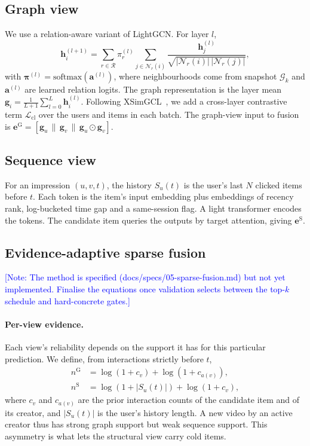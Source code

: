 \documentclass[sigconf,anonymous,review]{acmart}
\newif\ifshownotes \shownotestrue
\newcommand{\note}[1]{\ifshownotes\textcolor{blue}{[Note: #1]}\fi}
\newcommand{\bm}[1]{\boldsymbol{#1}}
\begin{document}
\subsection{Graph view}
We use a relation-aware variant of LightGCN. For layer $l$,
\begin{equation}
  \bm{h}^{(l+1)}_i = \sum_{r \in \mathcal{R}} \pi^{(l)}_r
    \sum_{j \in \mathcal{N}_r(i)} \frac{\bm{h}^{(l)}_j}{\sqrt{|\mathcal{N}_r(i)|\,|\mathcal{N}_r(j)|}},
\end{equation}
with $\bm{\pi}^{(l)} = \mathrm{softmax}(\bm{a}^{(l)})$,
where neighbourhoods come from snapshot $\mathcal{G}_k$ and $\bm{a}^{(l)}$
are learned relation logits. The graph representation is the layer mean
$\bm{g}_i = \frac{1}{L+1}\sum_{l=0}^{L} \bm{h}^{(l)}_i$. Following
XSimGCL~\cite{yu2023xsimgcl}, we add a cross-layer contrastive term
$\mathcal{L}_{\mathrm{cl}}$ over the users and items in each batch. The
graph-view input to fusion is
$\bm{e}^{\mathrm{G}} = [\bm{g}_u \,\|\, \bm{g}_v \,\|\, \bm{g}_u \odot \bm{g}_v]$.

\subsection{Sequence view}
For an impression $(u, v, t)$, the history $S_u(t)$ is the user's last $N$
clicked items before $t$. Each token is the item's input embedding plus
embeddings of recency rank, log-bucketed time gap and a same-session flag. A
light transformer encodes the tokens. The candidate item queries the outputs
by target attention, giving $\bm{e}^{\mathrm{S}}$.

\subsection{Evidence-adaptive sparse fusion}
\label{sec:fusion}
\note{The method is specified (docs/specs/05-sparse-fusion.md) but not yet
implemented. Finalise the equations once validation selects between the top-$k$
schedule and hard-concrete gates.}

\paragraph{Per-view evidence.}
Each view's reliability depends on the support it has for this particular
prediction. We define, from interactions strictly before $t$,
\begin{align}
  n^{\mathrm{G}} &= \log(1+c_v) + \log(1+c_{a(v)}), \\
  n^{\mathrm{S}} &= \log(1+|S_u(t)|) + \log(1+c_v),
\end{align}
where $c_v$ and $c_{a(v)}$ are the prior interaction counts of the candidate
item and of its creator, and $|S_u(t)|$ is the user's history length. A new
video by an active creator thus has strong graph support but weak sequence
support. This asymmetry is what lets the structural view carry cold items.
\end{document}
